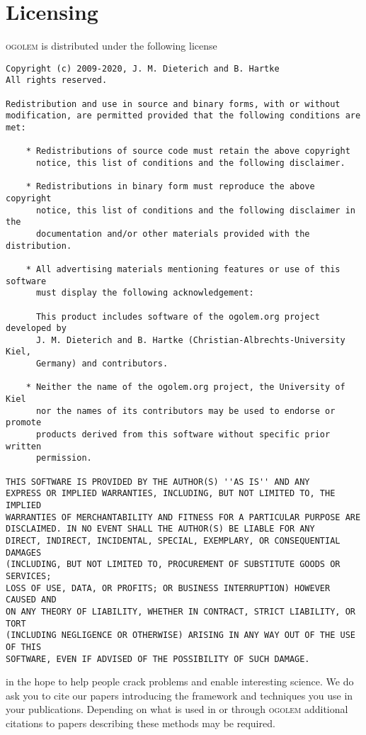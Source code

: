 \documentclass[a4paper,10pt]{scrbook}
\newcommand{\ogo}{\textsc{ogolem}}
\begin{document}
\section{Licensing}
\ogo{} is distributed under the following license
\begin{verbatim}
Copyright (c) 2009-2020, J. M. Dieterich and B. Hartke
All rights reserved.

Redistribution and use in source and binary forms, with or without
modification, are permitted provided that the following conditions are met:

    * Redistributions of source code must retain the above copyright
      notice, this list of conditions and the following disclaimer.

    * Redistributions in binary form must reproduce the above copyright
      notice, this list of conditions and the following disclaimer in the
      documentation and/or other materials provided with the distribution.

    * All advertising materials mentioning features or use of this software
      must display the following acknowledgement:

      This product includes software of the ogolem.org project developed by
      J. M. Dieterich and B. Hartke (Christian-Albrechts-University Kiel,
      Germany) and contributors.

    * Neither the name of the ogolem.org project, the University of Kiel
      nor the names of its contributors may be used to endorse or promote
      products derived from this software without specific prior written
      permission.

THIS SOFTWARE IS PROVIDED BY THE AUTHOR(S) ''AS IS'' AND ANY
EXPRESS OR IMPLIED WARRANTIES, INCLUDING, BUT NOT LIMITED TO, THE IMPLIED
WARRANTIES OF MERCHANTABILITY AND FITNESS FOR A PARTICULAR PURPOSE ARE
DISCLAIMED. IN NO EVENT SHALL THE AUTHOR(S) BE LIABLE FOR ANY
DIRECT, INDIRECT, INCIDENTAL, SPECIAL, EXEMPLARY, OR CONSEQUENTIAL DAMAGES
(INCLUDING, BUT NOT LIMITED TO, PROCUREMENT OF SUBSTITUTE GOODS OR SERVICES;
LOSS OF USE, DATA, OR PROFITS; OR BUSINESS INTERRUPTION) HOWEVER CAUSED AND
ON ANY THEORY OF LIABILITY, WHETHER IN CONTRACT, STRICT LIABILITY, OR TORT
(INCLUDING NEGLIGENCE OR OTHERWISE) ARISING IN ANY WAY OUT OF THE USE OF THIS
SOFTWARE, EVEN IF ADVISED OF THE POSSIBILITY OF SUCH DAMAGE.
\end{verbatim}
in the hope to help people crack problems and enable interesting science. We do 
ask you to cite our papers
introducing the framework and techniques you use in your
publications\cite{ogolem_first,lj_reparam,ogo_switches, 
kana_dimer,benchmark,water_pccp,gdm,water_small,cage1,cage2,earth}. Depending 
on what is used in or through \ogo{} additional citations to papers describing 
these methods may be required.
\end{document}
